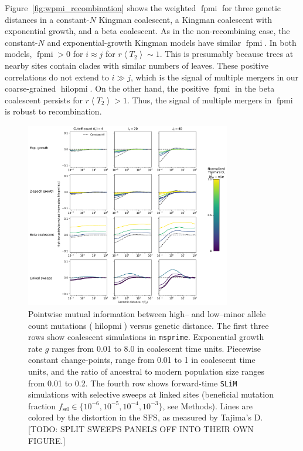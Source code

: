\documentclass[11pt, letterpaper]{article}   	%
\newcommand{\Fig}[1]{Figure~\ref{#1}}
\newcommand{\E}[1]{\left< #1 \right>}
\DeclareMathOperator{\fpmi}{fpmi}
\DeclareMathOperator{\hilopmi}{hilopmi}
\begin{document}
\Fig{fig:wpmi_recombination} shows the weighted $\fpmi$ for three genetic distances in a constant-$N$ Kingman coalescent, a Kingman coalescent with exponential growth, and a beta coalescent.
As in the non-recombining case, the constant-$N$ and exponential-growth Kingman models have similar $\fpmi$.
In both models, $\fpmi > 0$ for $i\approx j$ for $r\E{T_2} \sim 1$.
This is presumably because trees at nearby sites contain clades with similar numbers of leaves.
These positive correlations do not extend to $i \gg j$, which is the signal of multiple mergers in our coarse-grained $\hilopmi$.
On the other hand, the positive $\fpmi$ in the beta coalescent persists for $r\E{T_2} > 1$.
Thus, the signal of multiple mergers in $\fpmi$ is robust to recombination.

\begin{figure}
\centering
\includegraphics[width=0.8\textwidth]{figures/figure5.pdf}
\caption{Pointwise mutual information between high-- and low--minor allele count mutations ($\hilopmi$) versus genetic distance. The first three rows show coalescent simulations in \texttt{msprime}. Exponential growth rate $g$ ranges from 0.01 to 8.0 in coalescent time units. Piecewise constant change-points, range from 0.01 to 1 in coalescent time units, and the ratio of ancestral to modern population size ranges from 0.01 to 0.2. The fourth row shows forward-time \texttt{SLiM} simulations with selective sweeps at linked sites (beneficial mutation fraction $f_{\text{sel}} \in \{10^{-6}, 10^{-5}, 10^{-4}, 10^{-3}\}$, see Methods). Lines are colored by the distortion in the SFS, as measured by Tajima's D. [TODO: SPLIT SWEEPS PANELS OFF INTO THEIR OWN FIGURE.]\label{fig:hilo_vs_d}}
\end{figure}
\end{document}

